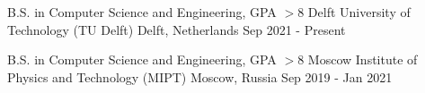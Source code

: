 

\begin{cventries}

  \cventry
    {B.S. in Computer Science and Engineering, GPA $> 8$} %
    {Delft University of Technology (TU Delft)} %
    {Delft, Netherlands} %
    {Sep 2021 - Present} %
    {
    }

  \vspace{-0.4cm}
  \cventry
    {B.S. in Computer Science and Engineering, GPA $> 8$} %
    {Moscow Institute of Physics and Technology (MIPT)} %
    {Moscow, Russia} %
    {Sep 2019 - Jan 2021} %
    {
    }
  \vspace{-0.5cm}
\end{cventries}

